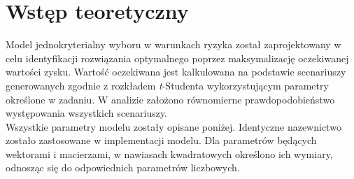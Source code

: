 \section{Wstęp teoretyczny}
Model jednokryterialny wyboru w warunkach ryzyka został zaprojektowany w celu identyfikacji rozwiązania 
optymalnego poprzez maksymalizację oczekiwanej wartości zysku. Wartość oczekiwana jest kalkulowana na 
podstawie scenariuszy generowanych zgodnie z rozkładem \textit{t}-Studenta wykorzystującym parametry 
określone w zadaniu. W analizie założono równomierne prawdopodobieństwo występowania wszystkich 
scenariuszy. \\
Wszystkie parametry modelu zostały opisane poniżej. 
Identyczne nazewnictwo zostało zastosowane w implementacji modelu. Dla parametrów będących wektorami 
i macierzami, w nawiasach kwadratowych określono ich wymiary, odnosząc się do odpowiednich parametrów liczbowych.
	
	
	
	
	
	
	
